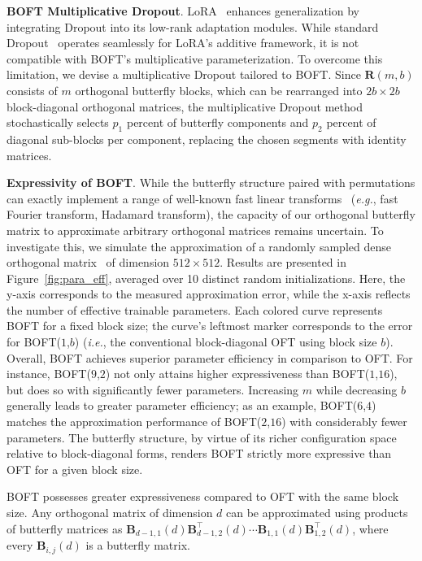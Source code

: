\textbf{BOFT Multiplicative Dropout}. LoRA~\cite{hulora2022} enhances generalization by integrating Dropout into its low-rank adaptation modules. While standard Dropout~\cite{srivastava2014dropout} operates seamlessly for LoRA's additive framework, it is not compatible with BOFT's multiplicative parameterization. To overcome this limitation, we devise a multiplicative Dropout tailored to BOFT. Since $\bm{R}(m,b)$ consists of $m$ orthogonal butterfly blocks, which can be rearranged into $2b\times 2b$ block-diagonal orthogonal matrices, the multiplicative Dropout method stochastically selects $p_1$ percent of butterfly components and $p_2$ percent of diagonal sub-blocks per component, replacing the chosen segments with identity matrices.

\textbf{Expressivity of BOFT}. While the butterfly structure paired with permutations can exactly implement a range of well-known fast linear transforms~\cite{dao2019learning,dao2019kaleidoscope} (\emph{e.g.}, fast Fourier transform, Hadamard transform), the capacity of our orthogonal butterfly matrix to approximate arbitrary orthogonal matrices remains uncertain. To investigate this, we simulate the approximation of a randomly sampled dense orthogonal matrix~\cite{anderson1987generation} of dimension $512\times 512$. Results are presented in Figure~\ref{fig:para_eff}, averaged over 10 distinct random initializations. Here, the y-axis corresponds to the measured approximation error, while the x-axis reflects the number of effective trainable parameters. Each colored curve represents BOFT for a fixed block size; the curve’s leftmost marker corresponds to the error for BOFT($1$,$b$) (\emph{i.e.}, the conventional block-diagonal OFT using block size $b$). Overall, BOFT achieves superior parameter efficiency in comparison to OFT. For instance, BOFT($9$,$2$) not only attains higher expressiveness than BOFT($1$,$16$), but does so with significantly fewer parameters. Increasing $m$ while decreasing $b$ generally leads to greater parameter efficiency; as an example, BOFT($6$,$4$) matches the approximation performance of BOFT($2$,$16$) with considerably fewer parameters. The butterfly structure, by virtue of its richer configuration space relative to block-diagonal forms, renders BOFT strictly more expressive than OFT for a given block size.

\begin{theorem}\label{thm:exp_boft}
    BOFT possesses greater expressiveness compared to OFT with the same block size. Any orthogonal matrix of dimension $d$ can be approximated using products of butterfly matrices as $\bm{B}_{d-1,1}(d)\bm{B}^\top_{d-1,2}(d)\cdots\bm{B}_{1,1}(d)\bm{B}^\top_{1,2}(d)$, where every $\bm{B}_{i,j}(d)$ is a butterfly matrix.
\end{theorem}

